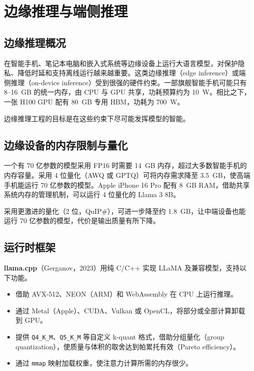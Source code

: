
\chapter{边缘推理与端侧推理}

\section{边缘推理概况}

在智能手机、笔记本电脑和嵌入式系统等边缘设备上运行大语言模型，对保护隐私、降低时延和支持离线运行越来越重要。这类边缘推理（edge inference）或端侧推理（on-device inference）受到很强的硬件约束。一部旗舰智能手机可能只有 8–16~GB 的统一内存，由 CPU 与 GPU 共享，功耗预算约为 10~W。相比之下，一张 H100 GPU 配有 80~GB 专用 HBM，功耗为 700~W。

边缘推理工程的目标是在这些约束下尽可能发挥模型的智能。

\section{边缘设备的内存限制与量化}

一个有 70 亿参数的模型采用 FP16 时需要 14~GB 内存，超过大多数智能手机的内存容量。采用 4 位量化（AWQ 或 GPTQ）可将内存需求降至 3.5~GB，使高端手机能运行 70 亿参数的模型。Apple iPhone 16 Pro 配有 8~GB RAM，借助共享系统内存的管理机制，可以运行 4 位量化的 Llama 3 8B。

采用更激进的量化（2 位，QuIP\#），可进一步降至约 1.8~GB，让中端设备也能运行 70 亿参数的模型，代价是输出质量有所下降。

\section{运行时框架}

\textbf{llama.cpp}（Gerganov，2023）用纯 C/C++ 实现 LLaMA 及兼容模型，支持以下功能。

\begin{itemize}
  \item 借助 AVX-512、NEON（ARM）和 WebAssembly 在 CPU 上运行推理。
  \item 通过 Metal（Apple）、CUDA、Vulkan 或 OpenCL，将部分或全部计算卸载到 GPU。
  \item 提供 \texttt{Q4\_K\_M}、\texttt{Q5\_K\_M} 等自定义 k-quant 格式，借助分组量化（group quantization），使质量与体积的取舍达到帕累托有效（Pareto efficiency）。
  \item 通过 \texttt{mmap} 映射加载权重，使注意力计算所需的内存很少。
\end{itemize}

